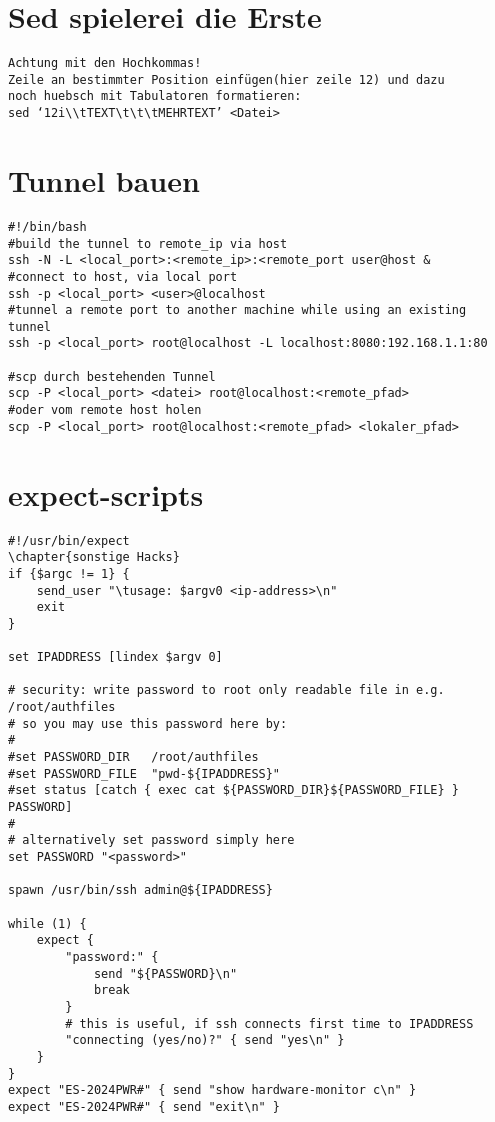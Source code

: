 \documentclass[a4paper,10pt]{report}
\begin{document}
\section{Sed spielerei die Erste}
\begin{verbatim}
Achtung mit den Hochkommas!
Zeile an bestimmter Position einfügen(hier zeile 12) und dazu 
noch huebsch mit Tabulatoren formatieren:
sed ‘12i\\tTEXT\t\t\tMEHRTEXT’ <Datei>
\end{verbatim}
\section{Tunnel bauen}
\begin{verbatim}
#!/bin/bash
#build the tunnel to remote_ip via host
ssh -N -L <local_port>:<remote_ip>:<remote_port user@host &
#connect to host, via local port
ssh -p <local_port> <user>@localhost
#tunnel a remote port to another machine while using an existing tunnel
ssh -p <local_port> root@localhost -L localhost:8080:192.168.1.1:80

#scp durch bestehenden Tunnel
scp -P <local_port> <datei> root@localhost:<remote_pfad>
#oder vom remote host holen
scp -P <local_port> root@localhost:<remote_pfad> <lokaler_pfad>

\end{verbatim}

\section{expect-scripts}
\begin{verbatim}
#!/usr/bin/expect
\chapter{sonstige Hacks}
if {$argc != 1} {
    send_user "\tusage: $argv0 <ip-address>\n"
    exit
}

set IPADDRESS [lindex $argv 0]

# security: write password to root only readable file in e.g. /root/authfiles
# so you may use this password here by:
#
#set PASSWORD_DIR   /root/authfiles
#set PASSWORD_FILE  "pwd-${IPADDRESS}"
#set status [catch { exec cat ${PASSWORD_DIR}${PASSWORD_FILE} } PASSWORD]
#
# alternatively set password simply here
set PASSWORD "<password>"

spawn /usr/bin/ssh admin@${IPADDRESS}

while (1) {
    expect {
        "password:" {			
            send "${PASSWORD}\n"
            break
        }
        # this is useful, if ssh connects first time to IPADDRESS
        "connecting (yes/no)?" { send "yes\n" }
    }
}
expect "ES-2024PWR#" { send "show hardware-monitor c\n" }
expect "ES-2024PWR#" { send "exit\n" }

\end{verbatim}
\end{document}
